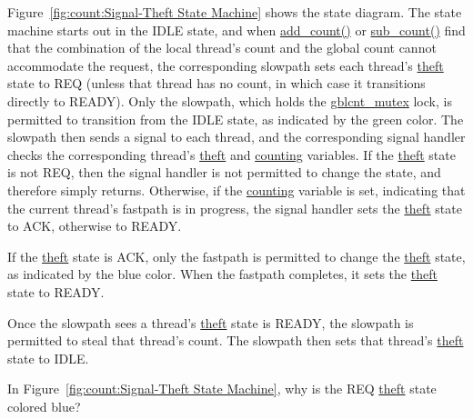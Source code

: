 Figure~\ref{fig:count:Signal-Theft State Machine} shows the
state diagram.
The state machine starts out in the IDLE state, and when \url{add_count()}
or \url{sub_count()} find that the combination of the local thread's count
and the global count cannot accommodate the request, the corresponding
slowpath sets each thread's \url{theft} state to REQ (unless that thread
has no count, in which case it transitions directly to READY).
Only the slowpath, which holds the \url{gblcnt_mutex} lock, is permitted to
transition from the IDLE state, as indicated by the green color.
The slowpath then sends a signal to each thread, and the corresponding
signal handler checks the corresponding thread's \url{theft} and
\url{counting} variables.
If the \url{theft} state is not REQ, then the signal handler is not
permitted to change the state, and therefore simply returns.
Otherwise, if the \url{counting} variable is set, indicating that
the current thread's fastpath is in progress, the signal handler
sets the \url{theft} state to ACK, otherwise to READY.

If the \url{theft} state is ACK,
only the fastpath is permitted to change
the \url{theft} state, as indicated by the blue color.
When the fastpath completes, it sets the \url{theft} state to READY.

Once the slowpath sees a thread's \url{theft} state is READY, the
slowpath is permitted to steal that thread's count.
The slowpath then sets that thread's \url{theft} state to IDLE.

\QuickQuiz{}
	In Figure~\ref{fig:count:Signal-Theft State Machine}, why is
	the REQ \url{theft} state colored blue?
 \QuickQuizEnd

